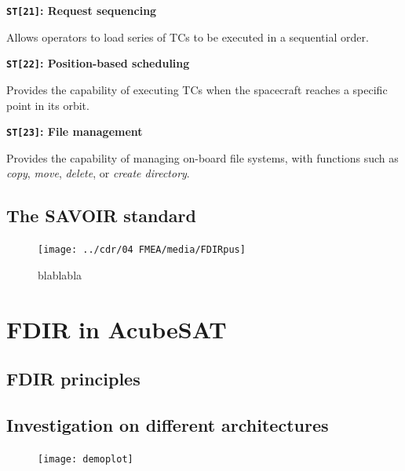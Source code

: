 \documentclass[a4paper,nobib]{tufte-book}
\begin{document}
\begin{compactitem}
	\item \textbf{\texttt{ST[21]}: Request sequencing}
	
	Allows operators to load series of \acp{TC} to be executed in a sequential order.
	
	\item \textbf{\texttt{ST[22]}: Position-based scheduling}
	
	Provides the capability of executing \acp{TC} when the spacecraft reaches a specific point in its orbit.
	
	\item \textbf{\texttt{ST[23]}: File management}
	
	Provides the capability of managing on-board file systems, with functions such as \emph{copy}, \emph{move}, \emph{delete}, or \emph{create directory}.
\end{compactitem}

\section{The SAVOIR standard}

\begin{figure}[h]
	\texttt{[image: ../cdr/04 FMEA/media/FDIRpus]}
	\caption{blablabla}
\end{figure}

\chapter{\ac{FDIR} in AcubeSAT}

\section{\ac{FDIR} principles}


\section{Investigation on different architectures}

\begin{figure}
	\centering
	\texttt{[image: demoplot]}
	\caption{}
\end{figure}
\end{document}
